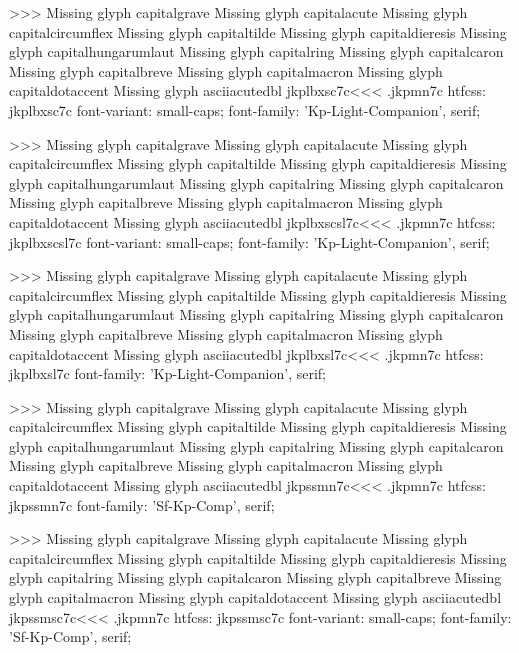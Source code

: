 >>>
Missing glyph	capitalgrave
Missing glyph	capitalacute
Missing glyph	capitalcircumflex
Missing glyph	capitaltilde
Missing glyph	capitaldieresis
Missing glyph	capitalhungarumlaut
Missing glyph	capitalring
Missing glyph	capitalcaron
Missing glyph	capitalbreve
Missing glyph	capitalmacron
Missing glyph	capitaldotaccent
Missing glyph	asciiacutedbl
\<jkplbxsc7c\><<<
.jkpmn7c
htfcss:  jkplbxsc7c  font-variant: small-caps; font-family: 'Kp-Light-Companion', serif;

>>>
Missing glyph	capitalgrave
Missing glyph	capitalacute
Missing glyph	capitalcircumflex
Missing glyph	capitaltilde
Missing glyph	capitaldieresis
Missing glyph	capitalhungarumlaut
Missing glyph	capitalring
Missing glyph	capitalcaron
Missing glyph	capitalbreve
Missing glyph	capitalmacron
Missing glyph	capitaldotaccent
Missing glyph	asciiacutedbl
\<jkplbxscsl7c\><<<
.jkpmn7c
htfcss:  jkplbxscsl7c  font-variant: small-caps; font-family: 'Kp-Light-Companion', serif;

>>>
Missing glyph	capitalgrave
Missing glyph	capitalacute
Missing glyph	capitalcircumflex
Missing glyph	capitaltilde
Missing glyph	capitaldieresis
Missing glyph	capitalhungarumlaut
Missing glyph	capitalring
Missing glyph	capitalcaron
Missing glyph	capitalbreve
Missing glyph	capitalmacron
Missing glyph	capitaldotaccent
Missing glyph	asciiacutedbl
\<jkplbxsl7c\><<<
.jkpmn7c
htfcss:  jkplbxsl7c  font-family: 'Kp-Light-Companion', serif;

>>>
Missing glyph	capitalgrave
Missing glyph	capitalacute
Missing glyph	capitalcircumflex
Missing glyph	capitaltilde
Missing glyph	capitaldieresis
Missing glyph	capitalhungarumlaut
Missing glyph	capitalring
Missing glyph	capitalcaron
Missing glyph	capitalbreve
Missing glyph	capitalmacron
Missing glyph	capitaldotaccent
Missing glyph	asciiacutedbl
\<jkpssmn7c\><<<
.jkpmn7c
htfcss:  jkpssmn7c  font-family: 'Sf-Kp-Comp', serif;

>>>
Missing glyph	capitalgrave
Missing glyph	capitalacute
Missing glyph	capitalcircumflex
Missing glyph	capitaltilde
Missing glyph	capitaldieresis
Missing glyph	capitalring
Missing glyph	capitalcaron
Missing glyph	capitalbreve
Missing glyph	capitalmacron
Missing glyph	capitaldotaccent
Missing glyph	asciiacutedbl
\<jkpssmsc7c\><<<
.jkpmn7c
htfcss:  jkpssmsc7c  font-variant: small-caps; font-family: 'Sf-Kp-Comp', serif;

